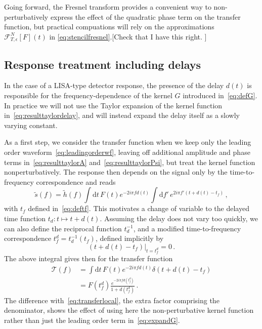 \documentclass[aps,showpacs,twocolumn,
prd,superscriptaddress,nofootinbib]{revtex4-1}
\newcommand{\be}{\begin{equation}}
\newcommand{\ee}{\end{equation}}
\newcommand\ud{{\mathrm{d}}}
\newcommand\calF{{\mathcal{F}}}
\newcommand\calT{{\mathcal{T}}}
\newcommand{\nn}{\nonumber}
\newcommand{\tf}{t_{f}}
\newcommand{\tfd}{t_{f}^{d}}
\newcommand{\jgb}[1]{{\color{DarkGreen} #1}}
\begin{document}
\jgb{Going forward, the Fresnel transform provides a convenient way to non-perturbatively express the effect of the quadratic phase term on the transfer function, but practical compuations will rely on the approximations $\calF_{T, \epsilon}^{N}[F] (t)$ in \eqref{eq:stencilfresnel}.[Check that I have this right. ]}


\subsection{Response treatment including delays}
\label{subsec:delays}

In the case of a LISA-type detector response, the presence of the delay $d(t)$ is responsible for the frequency-dependence of the kernel $G$ introduced in~\eqref{eq:defG}. \jgb{In practice we will not use the Taylor expansion of the kernel function in~\eqref{eq:resulttaylordelay}, and will instead expand the delay itself as a slowly varying constant.}

\jgb{As a first step, we consider the transfer function when we keep only the leading order waveform~\eqref{eq:leadingorderwf}, leaving off additional amplitude and phase terms in~\eqref{eq:resulttaylorA} and~\eqref{eq:resulttaylorPsi}, but treat the kernel function nonperturbatively.} The response then depends on the signal only by the time-to-frequency correspondence and reads
\begin{equation}
	\tilde{s}(f) = \tilde{h}(f) \int \ud t \, F(t) e^{-2i\pi f d(t)} \int \ud f' \, e^{2i\pi f' (t+d(t) - t_{f})} \,,
\end{equation}
with $\tf$ defined in~\eqref{eq:deftf}. This motivates a change of variable to the delayed time function $t_{d}:t \mapsto t+d(t)$. \jgb{Assuming the delay does not vary too quickly, we can} also define the reciprocal function $t_{d}^{-1}$, and a modified time-to-frequency correspondence $\tfd = t_{d}^{-1}(\tf)$, defined implicitly by
\be
	\left. (t + d(t) - t_{f})\right|_{t=t_{f}^{d}} = 0 \,.
\ee
The above integral gives then for the transfer function
\begin{align}\label{eq:delaycorrleading}
	\calT(f) &= \int \ud t \, F(t) e^{-2i\pi f d(t)} \delta(t + d(t) - t_{f}) \nn \\
	&= F(t_{f}^{d}) \frac{e^{-2i\pi f d(t_{f}^{d})}}{1+\dot{d}(t_{f}^{d})} \,.
\end{align}
\jgb{The difference with~\eqref{eq:transferlocal}, the extra factor comprising the denominator, shows the effect of using here the non-perturbative kernel function rather than just the leading order term in~\eqref{eq:expandG}.}
\end{document}
